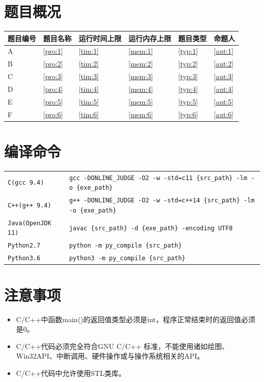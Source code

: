 \documentclass[
	lang=cn,
	color=green
]{elegantbook}
\begin{document}
\begin{titlepage}
	\section*{题目概况}
	\begin{tabularx}{450pt}{M|M|M|M|M|M}
		\toprule
		\textbf{题目编号} & \textbf{题目名称} & \textbf{运行时间上限} & \textbf{运行内存上限} & \textbf{题目类型} & \textbf{命题人} \\
		\midrule
		A                 & \ref*{pro:1}      & \ref*{tim:1}          & \ref*{mem:1}          & \ref*{typ:1}      & \ref*{aut:1}    \\
		B                 & \ref*{pro:2}      & \ref*{tim:2}          & \ref*{mem:2}          & \ref*{typ:2}      & \ref*{aut:2}    \\
		C                 & \ref*{pro:3}      & \ref*{tim:3}          & \ref*{mem:3}          & \ref*{typ:3}      & \ref*{aut:3}    \\
		D                 & \ref*{pro:4}      & \ref*{tim:4}          & \ref*{mem:4}          & \ref*{typ:4}      & \ref*{aut:4}    \\
		E                 & \ref*{pro:5}      & \ref*{tim:5}          & \ref*{mem:5}          & \ref*{typ:5}      & \ref*{aut:5}    \\
		F                 & \ref*{pro:6}      & \ref*{tim:6}          & \ref*{mem:6}          & \ref*{typ:6}      & \ref*{aut:6}    \\
		\bottomrule
	\end{tabularx}

	\section*{编译命令}
	\small
	\begin{tabularx}{450pt}{l|X}
		\toprule
		\verb|C(gcc 9.4)|  & \verb|gcc -DONLINE_JUDGE -O2 -w -std=c11 {src_path} -lm -o {exe_path}|  \\
		\verb|C++(g++ 9.4)|  & \verb|g++ -DONLINE_JUDGE -O2 -w -std=c++14 {src_path} -lm -o {exe_path}|  \\
		\verb|Java(OpenJDK 11)|  & \verb|javac {src_path} -d {exe_path} -encoding UTF8|  \\
		\verb|Python2.7|  & \verb|python -m py_compile {src_path}|  \\
		\verb|Python3.6| & \verb|python3 -m py_compile {src_path}| \\
		\bottomrule
	\end{tabularx}
	\normalsize

	\section*{注意事项}
	\begin{itemize}
		\item C/C++中函数main()的返回值类型必须是int，程序正常结束时的返回值必须是0。
		\item C/C++代码必须完全符合GNU C/C++ 标准，不能使用诸如绘图、Win32API、中断调用、硬件操作或与操作系统相关的API。
		\item C/C++代码中允许使用STL类库。
	\end{itemize}


\end{titlepage}
\end{document}
